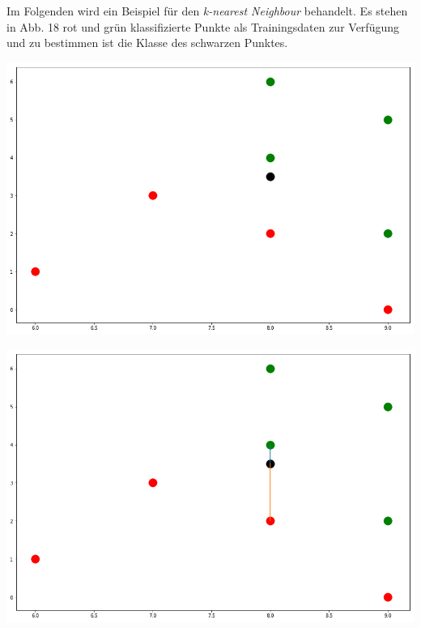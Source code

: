 \documentclass[fontsize=11pt]{scrartcl}
\newenvironment{Figure}
  {\par\medskip\noindent\minipage{\linewidth}}
  {\endminipage\par\medskip}
\begin{document}
                
               	Im Folgenden wird ein Beispiel für den \emph{k-nearest Neighbour} behandelt. Es stehen in Abb. 18 rot und grün klassifizierte Punkte als Trainingsdaten zur Verfügung und zu bestimmen ist die Klasse des schwarzen Punktes.\par  
                \begin{Figure}
                    \begin{minipage}[b]{.25\linewidth}
                        \includegraphics[width=\linewidth]{nn1.png}
                    \end{minipage}
                    \hspace{.1\linewidth}
                    \begin{minipage}[b]{.25\linewidth}
                        \includegraphics[width=\linewidth]{knn3.png}

\end{minipage}
\end{Figure}
\end{document}
